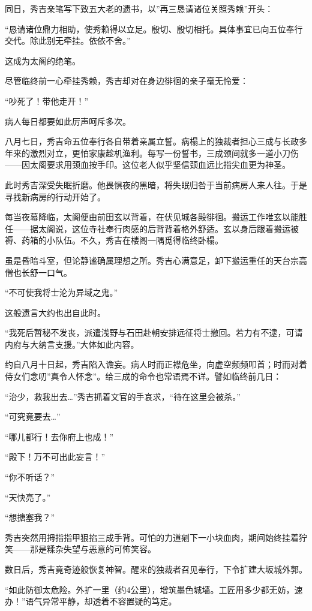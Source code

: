 \documentclass[
]{book}
\begin{document}
同日，秀吉亲笔写下致五大老的遗书，以''再三恳请诸位关照秀赖''开头：

``恳请诸位鼎力相助，使秀赖得以立足。殷切、殷切相托。具体事宜已向五位奉行交代。除此别无牵挂。依依不舍。''

这成为太阁的绝笔。

尽管临终前一心牵挂秀赖，秀吉却对在身边徘徊的亲子毫无怜爱：

``吵死了！带他走开！''

病人每日都要如此厉声呵斥多次。

八月七日，秀吉命五位奉行各自带着亲属立誓。病榻上的独裁者担心三成与长政多年来的激烈对立，更怕家康趁机渔利。每写一份誓书，三成颈间就多一道小刀伤------因太阁要求用颈血按手印。这位老人似乎坚信颈血远比指尖血更为神圣。

此时秀吉深受失眠折磨。他畏惧夜的黑暗，将失眠归咎于当前病房人来人往。于是寻找新病房的行动开始了。

每当夜幕降临，太阁便由前田玄以背着，在伏见城各殿徘徊。搬运工作唯玄以能胜任------据太阁说，这位寺社奉行肉感的后背背着格外舒适。玄以身后跟着搬运被褥、药箱的小队伍。不久，秀吉在楼阁一隅觅得临终卧榻。

虽是昏暗斗室，但论静谧确属理想之所。秀吉心满意足，卸下搬运重任的天台宗高僧也长舒一口气。

``不可使我将士沦为异域之鬼。''

这般遗言大约也出自此时。

``我死后暂秘不发丧，派遣浅野与石田赴朝安排远征将士撤回。若力有不逮，可请内府与大纳言支援。''大体如此内容。

约自八月十日起，秀吉陷入谵妄。病人时而正襟危坐，向虚空频频叩首；时而对着侍女们念叨''真令人怀念''。给三成的命令也常语焉不详。譬如临终前几日：

``治少，救我出去\ldots{}''秀吉抓着文官的手哀求，``待在这里会被杀。''

``可究竟要去\ldots{}''

``哪儿都行！去你府上也成！''

``殿下！万不可出此妄言！''

``你不听话？''

``天快亮了。''

``想搪塞我？''

秀吉突然用拇指指甲狠掐三成手背。可怕的力道剜下一小块血肉，期间始终挂着狞笑------那是糅杂失望与恶意的可怖笑容。

数日后，秀吉竟奇迹般恢复神智。醒来的独裁者召见奉行，下令扩建大坂城外郭。

``如此防御太危险。外扩一里（约4公里），增筑墨色城墙。工匠用多少都无妨，速办！''语气异常平静，却透着不容置疑的笃定。
\end{document}
